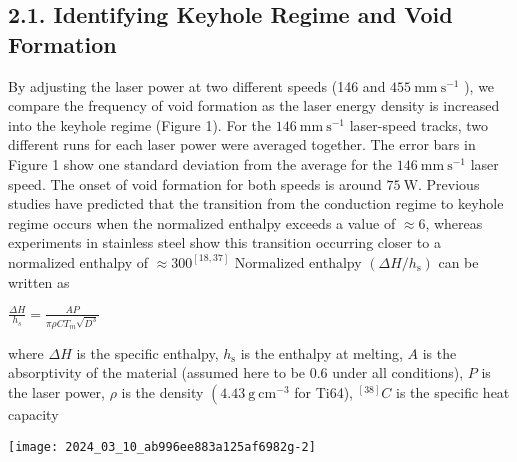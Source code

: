 \documentclass[10pt]{article}
\begin{document}
\subsection*{2.1. Identifying Keyhole Regime and Void Formation}
By adjusting the laser power at two different speeds (146 and $455 \mathrm{~mm} \mathrm{~s}^{-1}$ ), we compare the frequency of void formation as the laser energy density is increased into the keyhole regime (Figure 1). For the $146 \mathrm{~mm} \mathrm{~s}^{-1}$ laser-speed tracks, two different runs for each laser power were averaged together. The error bars in Figure 1 show one standard deviation from the average for the $146 \mathrm{~mm} \mathrm{~s}^{-1}$ laser speed. The onset of void formation for both speeds is around $75 \mathrm{~W}$. Previous studies have predicted that the transition from the conduction regime to keyhole regime occurs when the normalized enthalpy exceeds a value of $\approx 6$, whereas experiments in stainless steel show this transition occurring closer to a normalized enthalpy of $\approx 300^{[18,37]}$ Normalized enthalpy $\left(\Delta H / h_{\mathrm{s}}\right)$ can be written as

$\frac{\Delta H}{h_{s}}=\frac{A P}{\pi \rho C T_{m} \sqrt{D^{3}}}$

where $\Delta H$ is the specific enthalpy, $h_{\mathrm{s}}$ is the enthalpy at melting, $A$ is the absorptivity of the material (assumed here to be 0.6 under all conditions), $P$ is the laser power, $\rho$ is the density $\left(4.43 \mathrm{~g} \mathrm{~cm}^{-3}\right.$ for Ti64), ${ }^{[38]} C$ is the specific heat capacity

\begin{center}
\texttt{[image: 2024\_03\_10\_ab996ee883a125af6982g-2]}
\end{center}
\end{document}
